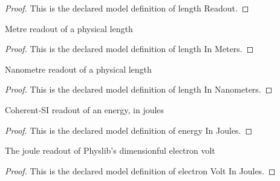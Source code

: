 \begin{proof}
  This is the declared model definition of length Readout.
\end{proof}
\begin{definition}
  \label{def:physics:phyx-mini-0532:phyxminiproblems-problemphyxmini0532-lengthinmeters}
  Metre readout of a physical length
\end{definition}
\begin{proof}
  This is the declared model definition of length In Meters.
\end{proof}
\begin{definition}
  \label{def:physics:phyx-mini-0532:phyxminiproblems-problemphyxmini0532-lengthinnanometers}
  Nanometre readout of a physical length
\end{definition}
\begin{proof}
  This is the declared model definition of length In Nanometers.
\end{proof}
\begin{definition}
  \label{def:physics:phyx-mini-0532:phyxminiproblems-problemphyxmini0532-energyinjoules}
  Coherent-SI readout of an energy, in joules
\end{definition}
\begin{proof}
  This is the declared model definition of energy In Joules.
\end{proof}
\begin{definition}
  \label{def:physics:phyx-mini-0532:phyxminiproblems-problemphyxmini0532-electronvoltinjoules}
  The joule readout of Physlib's dimensionful electron volt
\end{definition}
\begin{proof}
  This is the declared model definition of electron Volt In Joules.
\end{proof}
